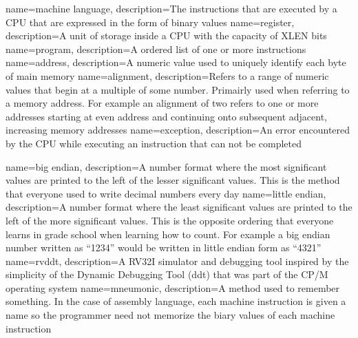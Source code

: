 {
	name={machine language},
	description={The instructions that are executed by a CPU that are expressed
		in the form of binary values}
}
{
	name={register},
	description={A unit of storage inside a CPU with the capacity of XLEN bits}
}
{
	name={program},
	description={A ordered list of one or more instructions}
}
{
	name={address},
	description={A numeric value used to uniquely identify each byte of main memory}
}
{
	name={alignment},
	description={Refers to a range of numeric values that begin 
		at a multiple of some number.  Primairly used when referring to
		a memory address.  For example an alignment of two refers to one
		or more addresses starting at even address and continuing onto
		subsequent adjacent, increasing memory addresses}
}
{
	name={exception},
	description={An error encountered by the CPU while executing an instruction
		that can not be completed}
}

{
	name={big endian},
	description={A number format where the most significant values are 
	printed to the left of the lesser significant values.  This is the
	method that everyone used to write decimal numbers every day}
}
{
	name={little endian},
	description={A number format where the least significant values are 
		printed to the left of the more significant values.  This is the
		opposite ordering that everyone learns in grade school when learning
		how to count.  For example a big endian number written as ``1234''
		would be written in little endian form as ``4321''}
}
{
	name={rvddt},
	description={A RV32I simulator and debugging tool inspired by the 
		simplicity of the Dynamic Debugging Tool (ddt) that was part of 
		the CP/M operating system}
}
{
	name={mneumonic},
	description={A method used to remember something.  In the case of
		assembly language, each machine instruction is given a name
		so the programmer need not memorize the biary values of each
		machine instruction}
}

